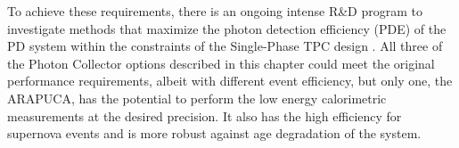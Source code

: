 

To achieve these requirements, there is an ongoing intense R\&D program to investigate methods that maximize the photon detection efficiency (PDE) of the PD system within the constraints of the Single-Phase TPC design .  All three of the Photon Collector options described in this chapter could meet the original performance requirements, albeit with different event efficiency, but only one, the ARAPUCA, has the potential to perform the low energy calorimetric measurements at the desired precision. It also has the high  efficiency for supernova events and is more robust against age degradation of the system. 


